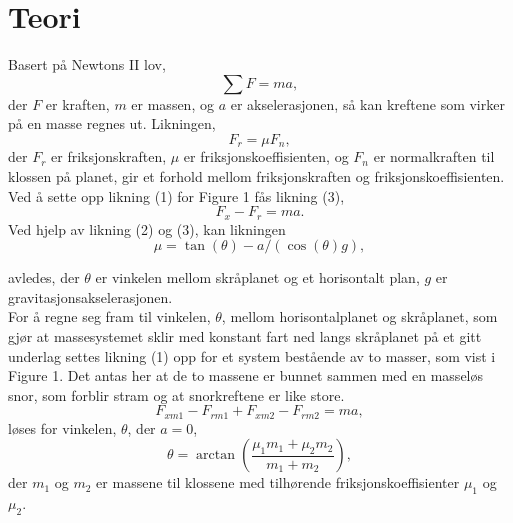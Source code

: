 \documentclass[10pt,a4paper]{report}
\begin{document}
{\let\clearpage\relax\chapter*{Teori}}
Basert på Newtons II lov, 
\begin{equation}
\sum{F} = ma,
\end{equation} der $F$ er kraften, $m$ er massen, og $a$ er akselerasjonen, så kan kreftene som virker på en masse regnes ut. Likningen,
\begin{equation}
F_r = \mu F_n,
\end{equation}
der $F_r$ er friksjonskraften, $\mu$ er friksjonskoeffisienten, og $F_n$ er normalkraften til klossen på planet, gir et forhold mellom friksjonskraften og friksjonskoeffisienten. Ved å sette opp likning (1) for Figure 1 fås likning (3),
\begin{equation}
F_x - F_r = ma.
\end{equation}
 Ved hjelp av likning (2) og (3), kan likningen 
\begin{equation}
\mu = \tan(\theta)-a/(\cos(\theta)g),
\end{equation}


avledes, der $\theta$ er vinkelen mellom skråplanet og et horisontalt plan, $g$ er gravitasjonsakselerasjonen. \\
For å regne seg fram til vinkelen, $\theta$, mellom horisontalplanet og skråplanet, som gjør at massesystemet sklir med konstant fart ned langs skråplanet på et gitt underlag settes likning (1) opp for et system bestående av to masser, som vist i Figure 1. Det antas her at de to massene er bunnet sammen med en masseløs snor, som forblir stram og at snorkreftene er like store.
\begin{equation}
F_{xm1} - F_{rm1} + F_{xm2} - F_{rm2} = ma,
\end{equation}
løses for vinkelen, $\theta$, der $a = 0$, 
\begin{equation}
\theta = \arctan(\frac{\mu_1m_1+\mu_2m_2}{m_1+m_2}),
\end{equation}
der $m_1$ og $m_2$ er massene til klossene med tilhørende friksjonskoeffisienter $\mu_1$ og $\mu_2$.
\end{document}
